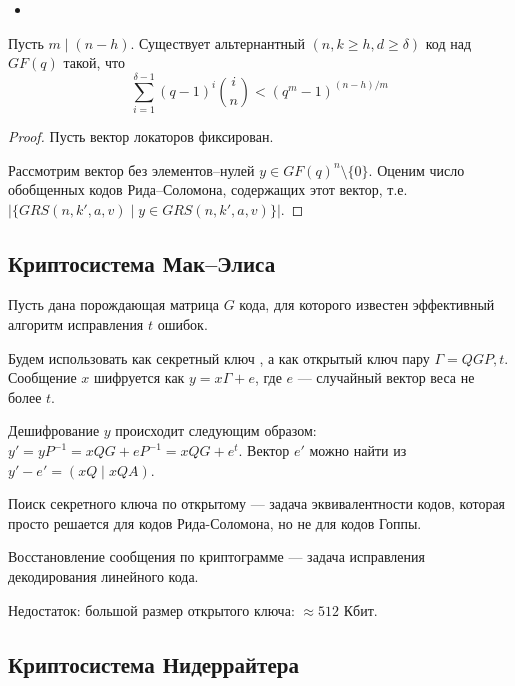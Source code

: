 \begin{itemize}
    \item \unfinished
\end{itemize}

\begin{theorem}
    Пусть \(m \mid (n - h)\).
    Существует альтернантный \((n,k \geq h,d \geq \delta)\) код над \(GF(q)\)
    такой, что
    \[\sum_{i = 1}^{\delta - 1}(q -1)^i \binom{i}{n} < (q^m - 1)^{(n - h) / m}\]
\end{theorem}
\begin{proof}
    Пусть вектор локаторов фиксирован.
    
    Рассмотрим вектор без элементов--нулей
    \(y \in GF(q)^n \setminus \{0\}\).
    Оценим число обобщенных кодов Рида--Соломона, содержащих этот вектор, т.е.
    \(|\{GRS(n,k',a,v) \mid y \in GRS(n,k',a,v)\}|\).
    
    \unfinished
\end{proof}

\unfinished

\subsection{Криптосистема Мак--Элиса}

Пусть дана порождающая матрица \(G\) кода, для которого известен
эффективный алгоритм исправления \(t\) ошибок.

Будем использовать как секретный ключ \unfinished,
а как открытый ключ пару \(\Gamma = QGP, t\).
Сообщение \(x\) шифруется как \(y = x\Gamma + e\), где \(e\) --- случайный
вектор веса не более \(t\).

Дешифрование \(y\) происходит следующим образом:
\(y' = yP^{-1} = xQG + eP^{-1} = xQG + e^t\).
Вектор \(e'\) можно найти из \(y' - e' = (xQ \mid xQA)\).

Поиск секретного ключа по открытому --- задача эквивалентности кодов,
которая просто решается для кодов Рида-Соломона, но не для кодов Гоппы.

Восстановление сообщения по криптограмме --- задача исправления декодирования
линейного кода.

Недостаток: большой размер открытого ключа: \( \approx 512\) Кбит.

\subsection{Криптосистема Нидеррайтера}

\unfinished